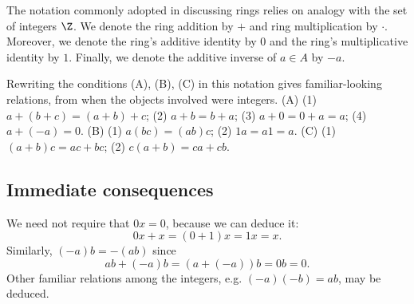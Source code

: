 The notation commonly adopted in discussing rings relies on analogy with the set of integers $\Z $.
We denote the ring addition by $+$ and ring multiplication by $\cdot $.
Moreover, we denote the ring's additive identity by $0$ and the ring's multiplicative identity by $1$.
Finally, we denote the additive inverse of $a \in A$ by $-a$.

Rewriting the conditions (A), (B), (C) in this notation gives familiar-looking relations, from when the objects involved were integers.
(A) (1) $a+(b + c) = (a+b)+c$; (2) $a+b = b+a$; (3) $a + 0 = 0 + a = a$; (4) $a + (-a) = 0$.
(B) (1) $a(bc) = (ab)c$; (2) $1a = a1 = a$.
(C) (1) $(a+b)c = ac + bc$; (2) $c(a+b) = ca + cb$.

\subsection*{Immediate consequences}

We need not require that $0x = 0$, because we can deduce it:
\[
0x + x = (0 + 1)x = 1x = x.
\]
Similarly, $(-a)b = -(ab)$ since
\[
ab + (-a)b = (a + (-a))b = 0b = 0.
\]
Other familiar relations among the integers, e.g. $(-a)(-b) = ab$, may be deduced.
